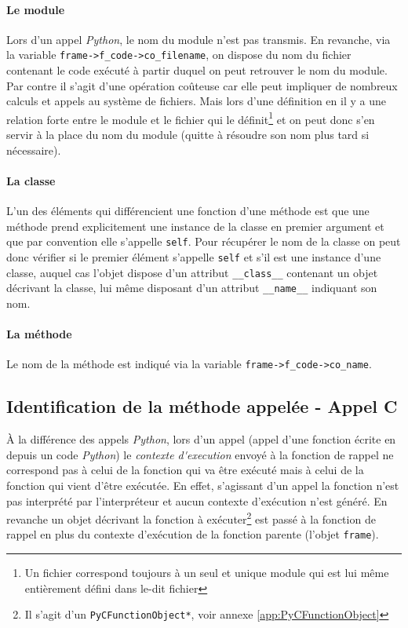 \paragraph*{Le module} Lors d'un appel \emph{Python}, le nom du module n'est pas transmis. En revanche,  via la variable \verb|frame->f_code->co_filename|, on dispose du nom du fichier contenant le code exécuté à partir duquel on peut retrouver le nom du module. Par contre il s'agit d'une opération coûteuse car elle peut impliquer de nombreux calculs et appels au système de fichiers. Mais lors d'une définition en \Python il y a une relation forte entre le module et le fichier qui le définit\footnote{Un fichier correspond toujours à un seul et unique module qui est lui même entièrement défini dans le-dit fichier} et on peut donc s'en servir à la place du nom du module (quitte à résoudre son nom plus tard si nécessaire).

\paragraph*{La classe} L'un des éléments qui différencient une fonction d'une méthode est que une méthode prend explicitement une instance de la classe en premier argument et que par convention elle s'appelle \verb|self|. Pour récupérer le nom de la classe on peut donc vérifier si le premier élément s'appelle \verb|self| et s'il est une instance d'une classe, auquel cas l'objet dispose d'un attribut \verb|__class__| contenant un objet décrivant la classe, lui même disposant d'un attribut \verb|__name__| indiquant son nom.

\paragraph*{La méthode} Le nom de la méthode est indiqué via la variable \verb|frame->f_code->co_name|.

\subsection{Identification de la méthode appelée - Appel C}
À la différence des appels \emph{Python}, lors d'un appel \C (appel d'une fonction écrite en \C depuis un code \emph{Python}) le \emph{\gls{contexte d'execution}} envoyé à la fonction de rappel ne correspond pas à celui de la fonction qui va être exécuté mais à celui de la fonction qui vient d'être exécutée. En effet, s'agissant d'un appel \C la fonction n'est pas interprété par l'interpréteur et aucun contexte d'exécution n'est généré. En revanche un objet décrivant la fonction \C à exécuter\footnote{Il s'agit d'un \verb?PyCFunctionObject*?, voir annexe \vref{app:PyCFunctionObject}} est passé à la fonction de rappel en plus du contexte d'exécution de la fonction parente (l'objet \verb|frame|).

